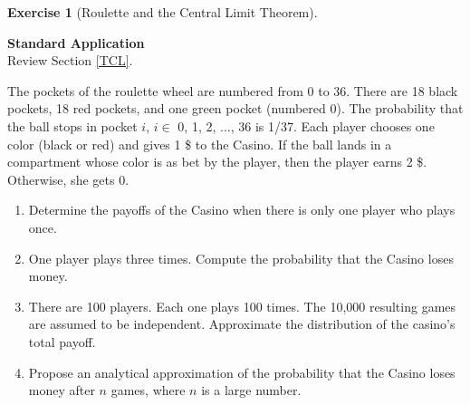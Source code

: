 \documentclass[
  11pt,
]{book}
\theoremstyle{definition}
\theoremstyle{definition}
\theoremstyle{definition}
\newtheorem{exercise}{Exercise}[chapter]
\theoremstyle{definition}
\theoremstyle{remark}
\begin{document}
\begin{exercisebox}

\begin{exercise}[Roulette and the Central Limit Theorem]
\protect\hypertarget{exr:clt-roulette}{}\label{exr:clt-roulette}

\textbf{Standard \textbar{} Application}\\
Review Section \ref{TCL}.

The pockets of the roulette wheel are numbered from 0 to 36. There are 18 black pockets, 18 red pockets, and one green pocket (numbered 0). The probability that the ball stops in pocket \(i\), \(i \in\) 0, 1, 2, ..., 36 is 1/37. Each player chooses one color (black or red) and gives 1 \$ to the Casino. If the ball lands in a compartment whose color is as bet by the player, then the player earns 2 \$. Otherwise, she gets 0.

\begin{enumerate}
\def\labelenumi{\arabic{enumi}.}
\item
  Determine the payoffs of the Casino when there is only one player who plays once.
\item
  One player plays three times. Compute the probability that the Casino loses money.
\item
  There are 100 players. Each one plays 100 times. The 10,000 resulting games are assumed to be independent. Approximate the distribution of the casino's total payoff.
\item
  Propose an analytical approximation of the probability that the Casino loses money after \(n\) games, where \(n\) is a large number.
\end{enumerate}

\end{exercise}

\end{exercisebox}

\end{document}
